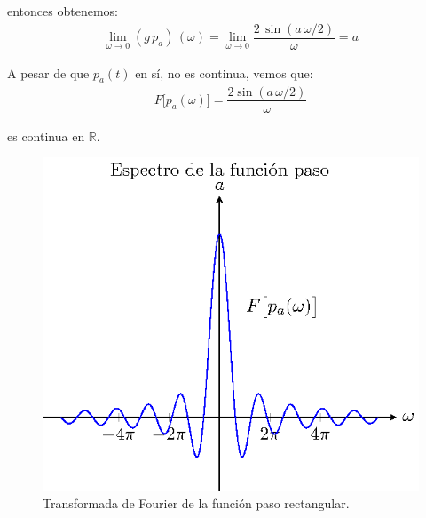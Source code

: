entonces obtenemos:
\begin{align*}
\lim_{\omega \to 0}  (g \, p_{a}) \, (\omega) = \lim_{\omega \to 0} \dfrac{2 \, \sin (a \, \omega /2)}{\omega} = a
\end{align*}

A pesar de que $p_{a}(t)$ en sí, no es continua, vemos que:
\begin{align}
F \big[p_{a}(\omega)\big] = \dfrac{2 \sin (a \, \omega/2)}{\omega}
\label{eq:ecuacion_06_11_Beerends}
\end{align}

es continua en $\mathbb{R}$.
\begin{figure}[H]
    \centering
    \includegraphics[scale=1]{Imagenes/T_Funcionpaso.eps}
    \caption{Transformada de Fourier de la función paso rectangular.}
    \label{fig:figura_Tfuncionpaso}
\end{figure}
%     

